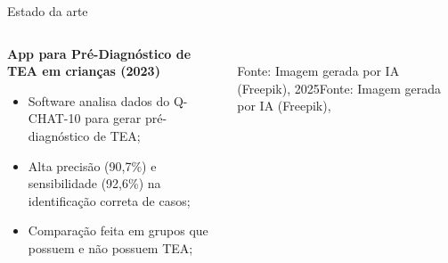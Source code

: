 \documentclass{beamer}
\begin{document}

\begin{frame}{Estado da arte}
\begin{columns}
        \begin{column}{0.6\textwidth}
            \justifying
            \textbf{App para Pré-Diagnóstico de TEA em crianças (2023)}
            \begin{itemize}
    \item Software analisa dados do Q-CHAT-10 para gerar pré-diagnóstico de TEA;
    
    \item Alta precisão (90,7\%) e sensibilidade (92,6\%) na identificação correta de casos;
    
    \item Comparação feita em grupos que possuem e não possuem TEA;
\end{itemize}
        \end{column}
         \begin{column}{0.35\textwidth}
            \centering
            \\[0.3cm]
            \tiny\textcolor{cpsgray}{Fonte: Imagem gerada por IA (Freepik), 2025}Fonte: Imagem gerada por IA (Freepik),
        \end{column}
        
    \end{columns}
\end{frame}
\end{document}
